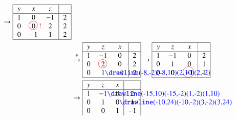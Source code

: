 \begin{beispiel}[\bf Beispiel]
\begin{align*}
\begin{tabular}{|>{$}c<{$}>{$}c<{$}>{$}c<{$}|>{$}c<{$}|}
\hline
\end{tabular}
\rightarrow
\begin{tabular}{|>{$}c<{$}>{$}c<{$}>{$}c<{$}|>{$}c<{$}|}
\hline
y&x&z&\\
\hline
1&0&-1&2\\
0&0%
\begin{picture}(0,0)
\color{red}\put(-3,4){\circle{12}}
\put(5,0){!}
\end{picture}%
&2&2\\
0&-1&1&2\\
\hline
\end{tabular}
\\
&\overset{\displaystyle *}{\rightarrow}
\begin{tabular}{|>{$}c<{$}>{$}c<{$}>{$}c<{$}|>{$}c<{$}|}
\hline
y&z&x&\\
\hline
1&-1&0&2\\
0& 2%
\begin{picture}(0,0)
\color{red}\put(-3,3.5){\circle{12}}
\end{picture}%
&0&2\\
0&1\begin{picture}(0,0)
\color{blue}\drawline(-8,-2)(-8,10)(2,10)(2,-2)
\end{picture}%
&-1&2\\
\hline
\end{tabular}
\rightarrow
\begin{tabular}{|>{$}c<{$}>{$}c<{$}>{$}c<{$}|>{$}c<{$}|}
\hline
y&z&x&\\
\hline
1&-1&0&2\\
0&1& 0&1\\
0&0&-1%
\begin{picture}(0,0)
\color{red}\put(-7,4){\circle{15}}
\end{picture}%
&1\\
\hline
\end{tabular}
\\
&\rightarrow
\begin{tabular}{|>{$}c<{$}>{$}c<{$}>{$}c<{$}|>{$}c<{$}|}
\hline
y&z&x&\\
\hline
1&-1%
\begin{picture}(0,0)
\color{blue}\drawline(-15,10)(-15,-2)(1,-2)(1,10)
\end{picture}%
&0&2\\
0&1& 0
\begin{picture}(0,0)%
\color{blue}\drawline(-10,24)(-10,-2)(3,-2)(3,24)%
\end{picture}%
&1\\
0&0&1&-1\\

\end{tabular}
\end{align*}
\end{beispiel}
